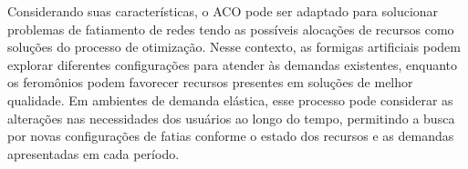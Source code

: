 Considerando suas características, o ACO pode ser adaptado para solucionar problemas de fatiamento de redes tendo as possíveis alocações de recursos como soluções do processo de otimização. Nesse contexto, as formigas artificiais podem explorar diferentes configurações para atender às demandas existentes, enquanto os feromônios podem favorecer recursos presentes em soluções de melhor qualidade. Em ambientes de demanda elástica, esse processo pode considerar as alterações nas necessidades dos usuários ao longo do tempo, permitindo a busca por novas configurações de fatias conforme o estado dos recursos e as demandas apresentadas em cada período.